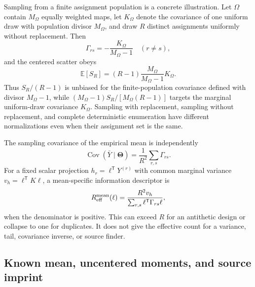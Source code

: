 \documentclass[11pt]{article}
\newcommand{\E}{\mathbb{E}}
\newcommand{\Cov}{\operatorname{Cov}}
\newcommand{\ThetaV}{\boldsymbol{\Theta}}
\begin{document}
Sampling from a finite assignment population is a concrete illustration.  Let
$\Omega$ contain $M_\Omega$ equally weighted maps, let $K_\Omega$ denote the
covariance of one uniform draw with population divisor $M_\Omega$, and draw
$R$ distinct assignments uniformly without replacement.  Then
\begin{equation}
  \Gamma_{rs}=-\frac{K_\Omega}{M_\Omega-1}
  \quad(r\ne s),
  \label{eq:without-replacement-cross-covariance}
\end{equation}
and the centered scatter obeys
\begin{equation}
  \E[S_R]
  =(R-1)\frac{M_\Omega}{M_\Omega-1}K_\Omega.
  \label{eq:finite-population-scatter}
\end{equation}
Thus $S_R/(R-1)$ is unbiased for the finite-population covariance defined with
divisor $M_\Omega-1$, while
$(M_\Omega-1)S_R/[M_\Omega(R-1)]$ targets the marginal uniform-draw covariance
$K_\Omega$.  Sampling with replacement, sampling without replacement, and
complete deterministic enumeration have different normalizations even when
their assignment set is the same.

The sampling covariance of the empirical mean is independently
\begin{equation}
  \Cov(\bar Y\mid\ThetaV)
  =\frac1{R^2}\sum_{r,s}\Gamma_{rs}.
  \label{eq:mean-covariance}
\end{equation}
For a fixed scalar projection $h_r=\ell^{\mathsf T}Y^{(r)}$ with common
marginal variance $v_h=\ell^{\mathsf T}K\ell$, a mean-specific information
descriptor is
\begin{equation}
  R_{\rm eff}^{\rm mean}(\ell)
  =\frac{R^2v_h}{\sum_{r,s}\ell^{\mathsf T}\Gamma_{rs}\ell},
  \label{eq:mean-effective-count}
\end{equation}
when the denominator is positive.  This can exceed $R$ for an antithetic
design or collapse to one for duplicates.  It does not give the effective
count for a variance, tail, covariance inverse, or source finder.

\subsection{Known mean, uncentered moments, and source imprint}
\end{document}
